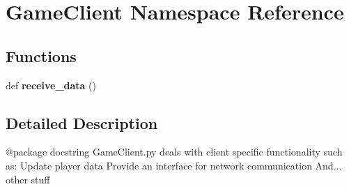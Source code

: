 \hypertarget{namespace_game_client}{}\section{Game\+Client Namespace Reference}
\label{namespace_game_client}
\subsection*{Functions}
\begin{DoxyCompactItemize}
\item 
\mbox{\label{namespace_game_client_aa2410d2d1b920195495aa5141dd79b52}} 
def {\bfseries receive\+\_\+data} ()
\end{DoxyCompactItemize}


\subsection{Detailed Description}
\begin{DoxyVerb}@package docstring
GameClient.py deals with client specific functionality such as:
Update player data
Provide an interface for network communication
And... other stuff
\end{DoxyVerb}
 
